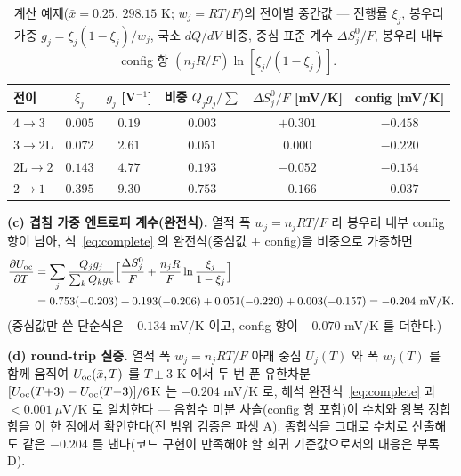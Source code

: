 \begin{table}[htbp]
\centering\small
\renewcommand{\arraystretch}{1.2}
\caption{계산 예제($\bar x{=}0.25$, $298.15$ K; $w_j{=}RT/F$)의 전이별 중간값 --- 진행률 $\xi_j$, 봉우리 가중
$g_j=\xi_j(1-\xi_j)/w_j$, 국소 $dQ/dV$ 비중, 중심 표준 계수 $\Delta S^0_j/F$, 봉우리 내부 config 항
$(n_jR/F)\ln[\xi_j/(1-\xi_j)]$.}
\label{tab:worked}
\begin{tabular}{lccccc}
\toprule
전이 & $\xi_j$ & $g_j$ [V$^{-1}$] & 비중 $Q_jg_j/\!\sum$ & $\Delta S^0_j/F$ [mV/K] & config [mV/K] \\
\midrule
$4\!\to\!3$   & $0.005$ & $0.19$ & $0.003$ & $+0.301$ & $-0.458$ \\
$3\!\to\!2\mathrm L$ & $0.072$ & $2.61$ & $0.051$ & $0.000$ & $-0.220$ \\
$2\mathrm L\!\to\!2$ & $0.143$ & $4.77$ & $0.193$ & $-0.052$ & $-0.154$ \\
$2\!\to\!1$   & $0.395$ & $9.30$ & $0.753$ & $-0.166$ & $-0.037$ \\
\bottomrule
\end{tabular}
\end{table}

\textbf{(c) 겹침 가중 엔트로피 계수(완전식).} 열적 폭 $w_j{=}n_jRT/F$ 라 봉우리 내부 config 항이 남아,
식~\eqref{eq:complete} 의 완전식(중심값 $+$ config)을 비중으로 가중하면
\begin{equation*}
\begin{aligned}
\frac{\partial U_{\mathrm{oc}}}{\partial T}
&=\sum_j\frac{Q_jg_j}{\sum_kQ_kg_k}\Big[\frac{\Delta S^0_j}{F}+\frac{n_jR}{F}\ln\frac{\xi_j}{1-\xi_j}\Big]\\
&=0.753(-0.203)+0.193(-0.206)+0.051(-0.220)+0.003(-0.157)
=-0.204\ \mathrm{mV/K}.
\end{aligned}
\end{equation*}
(중심값만 쓴 단순식은 $-0.134$ mV/K 이고, config 항이 $-0.070$ mV/K 를 더한다.)

\textbf{(d) round-trip 실증.} 열적 폭 $w_j{=}n_jRT/F$ 아래 중심 $U_j(T)$ 와 폭 $w_j(T)$ 를 함께 움직여
$U_{\mathrm{oc}}(\bar x,T)$ 를 $T\pm3$ K 에서 두 번 푼 유한차분 $[U_{\mathrm{oc}}(T{+}3)-U_{\mathrm{oc}}(T{-}3)]/6\,\mathrm K$ 는 $-0.204$
mV/K 로, 해석 완전식~\eqref{eq:complete} 과 $<\!0.001\ \mu$V/K 로 일치한다 --- 음함수 미분 사슬(config 항
포함)이 수치와 왕복 정합함을 이 한 점에서 확인한다(전 범위 검증은 파생 A). 종합식을 그대로 수치로 산출해도
같은 $-0.204$ 를 낸다(코드 구현이 만족해야 할 회귀 기준값으로서의 대응은 부록 D).


